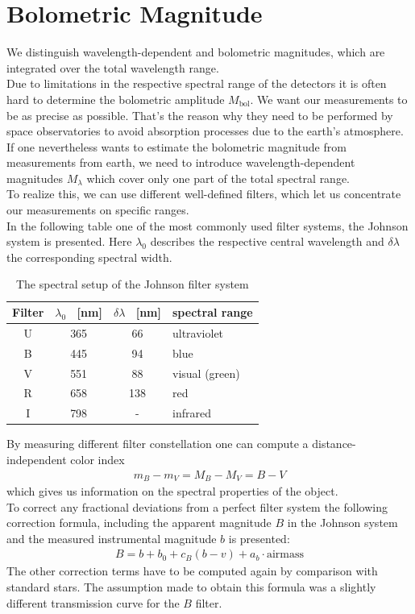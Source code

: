 \section{Bolometric Magnitude}
We distinguish wavelength-dependent and bolometric magnitudes, which are integrated over the total wavelength range. \\ 
Due to limitations in the respective spectral range of the detectors it is often hard to determine the bolometric amplitude $M_{\text{bol}}$. We want our measurements to be as precise as possible. That's the reason why they need to be performed by space observatories to avoid absorption processes due to the earth's atmosphere. \\
If one nevertheless wants to estimate the bolometric magnitude from measurements from earth, we need to introduce wavelength-dependent magnitudes $M_{\lambda}$ which cover only one part of the total spectral range. \\
 To realize this, we can use different well-defined filters, which let us concentrate our measurements on specific ranges. \\
In the following table one of the most commonly used filter systems, the Johnson system is presented. Here $\lambda_0$ describes the respective central wavelength and $\delta\lambda$ the corresponding spectral width.
\begin{table}[H]
\centering
\begin{tabular}{c|| c c l }
Filter & $\lambda_0$ \ [nm] & $\delta\lambda$ \ [nm] & spectral range \\ \hline \hline 
U & 365 & 66 & ultraviolet  \\
B & 445 & 94 & blue\\
V & 551 & 88 & visual (green) \\
R & 658 & 138 & red \\
I & 798 & - & infrared \\
\end{tabular}
\caption{\label{tab:johnson} The spectral setup of the Johnson filter system \cite{Pott2017}}
\end{table}

By measuring different filter constellation one can compute a distance-independent color index
\begin{align}
	m_B - m_V = M_B - M_V = B-V
\end{align}
which gives us information on the spectral properties of the object. \\
To correct any fractional deviations from a perfect filter system the following correction formula, including the apparent magnitude $B$ in the Johnson system and the measured instrumental magnitude $b$ is presented: 
\begin{align}
	B = b + b_0 + c_B(b-v) + a_b \cdot \text{airmass}
\end{align}
The other correction terms have to be computed again by comparison with standard stars. The assumption made to obtain this formula was a slightly different transmission curve for the $B$ filter.
